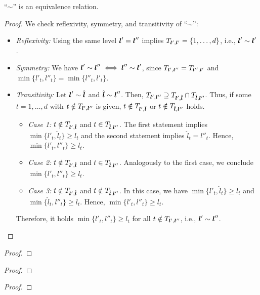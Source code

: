 \begin{shortlemma}
  \label{lemma:combiTechniqueEquivalenceRelation}
  ``$\sim$'' is an equivalence relation.
\end{shortlemma}

\begin{proof}
  We check reflexivity, symmetry, and transitivity of ``$\sim$'':
  \begin{itemize}
    \item
    \emph{Reflexivity:}
    Using the same level ${\boldsymbol{l}}' = {\boldsymbol{l}}''$ implies
    $T_{{\boldsymbol{l}}',{\boldsymbol{l}}'} = \{1, \dotsc, d\}$,
    i.e., ${\boldsymbol{l}}' \sim {\boldsymbol{l}}'$.
    
    \item
    \emph{Symmetry:}
    We have
    ${\boldsymbol{l}}' \sim {\boldsymbol{l}}'' \iff {\boldsymbol{l}}'' \sim {\boldsymbol{l}}'$, since
    $T_{{\boldsymbol{l}}',{\boldsymbol{l}}''} = T_{{\boldsymbol{l}}'',{\boldsymbol{l}}'}$ and
    $\min\{l'_t, l''_t\} = \min\{l''_t, l'_t\}$.
    
    \item
    \emph{Transitivity:}
    Let ${\boldsymbol{l}}' \sim \hat{{\boldsymbol{l}}}$ and $\hat{{\boldsymbol{l}}} \sim {\boldsymbol{l}}''$.
    Then, $T_{{\boldsymbol{l}}',{\boldsymbol{l}}''} \supseteq T_{{\boldsymbol{l}}',\hat{{\boldsymbol{l}}}} \cap T_{\hat{{\boldsymbol{l}}},{\boldsymbol{l}}''}$.
    Thus, if some $t = 1, \dotsc, d$ with $t \notin T_{{\boldsymbol{l}}',{\boldsymbol{l}}''}$ is given,
    $t \notin T_{{\boldsymbol{l}}',\hat{{\boldsymbol{l}}}}$ or $t \notin T_{\hat{{\boldsymbol{l}}},{\boldsymbol{l}}''}$ holds.
    \begin{itemize}
      \item
      \emph{Case 1:}
      $t \notin T_{{\boldsymbol{l}}',\hat{{\boldsymbol{l}}}}$ and $t \in T_{\hat{{\boldsymbol{l}}},{\boldsymbol{l}}''}$.
      The first statement implies $\min\{l'_t, \hat{l}_t\} \ge l_t$
      and the second statement implies $\hat{l}_t = l''_t$.
      Hence,
      $\min\{l'_t, l''_t\} \ge l_t$.
      
      \item
      \emph{Case 2:}
      $t \notin T_{{\boldsymbol{l}}',\hat{{\boldsymbol{l}}}}$ and $t \in T_{\hat{{\boldsymbol{l}}},{\boldsymbol{l}}''}$.
      Analogously to the first case, we conclude $\min\{l'_t, l''_t\} \ge l_t$.
      
      \item
      \emph{Case 3:}
      $t \notin T_{{\boldsymbol{l}}',\hat{{\boldsymbol{l}}}}$ and $t \notin T_{\hat{{\boldsymbol{l}}},{\boldsymbol{l}}''}$.
      In this case, we have
      $\min\{l'_t, \hat{l}_t\} \ge l_t$ and $\min\{\hat{l}_t, l''_t\} \ge l_t$.
      Hence,
      $\min\{l'_t, l''_t\} \ge l_t$.
    \end{itemize}
    Therefore, it holds $\min\{l'_t, l''_t\} \ge l_t$
    for all $t \notin T_{{\boldsymbol{l}}',{\boldsymbol{l}}''}$, i.e., ${\boldsymbol{l}}' \sim {\boldsymbol{l}}''$.
    \qedhere
  \end{itemize}
\end{proof}

\lemmaCombiTechniqueIdenticalValues*

\begin{proof}
  \blindtext{}
\end{proof}

\lemmaCombiTechniqueCharacterization*

\begin{proof}
  \blindtext{}
\end{proof}

\propCombiTechniqueZero*

\begin{proof}
  \blindtext{}
\end{proof}
